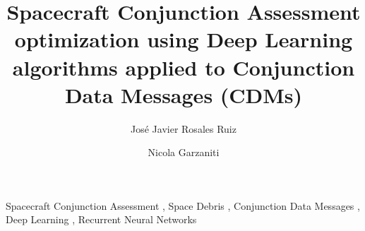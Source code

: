 \documentclass[3p, twocolumn]{elsarticle}
\begin{document}
\begin{frontmatter}

\title{Spacecraft Conjunction Assessment optimization using Deep Learning algorithms applied to Conjunction Data Messages (CDMs)} 



\author{José Javier Rosales Ruiz } %


\author{Nicola Garzaniti} 
            


\begin{abstract}

\end{abstract}

\begin{keyword}
Spacecraft Conjunction Assessment \sep
Space Debris \sep 
Conjunction Data Messages \sep 
Deep Learning \sep 
Recurrent Neural Networks
\end{keyword}

\end{frontmatter}

\linenumbers
\end{document}
